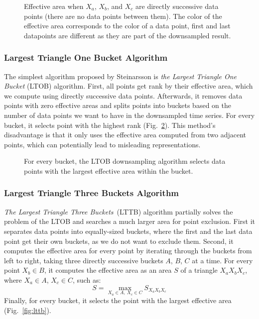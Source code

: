 \begin{figure}[htp]
    \centering
    
    \caption{Effective area when $X_a$, $X_b$, and $X_c$ are directly successive data points (there are no data points between them). The color of the effective area corresponds to the color of a data point, first and last datapoints are different as they are part of the downsampled result.}
    \label{fig:effective-area}
\end{figure}

\subsubsection{Largest Triangle One Bucket Algorithm}
The simplest algorithm proposed by Steinarsson is \textit{the Largest Triangle One Bucket} (LTOB) algorithm. First, all points get rank by their effective area, which we compute using directly successive data points. Afterwards, it removes data points with zero effective areas and splits points into buckets based on the number of data points we want to have in the downsampled time series. For every bucket, it selects point with the highest rank (Fig.~\ref{fig:ltob}). This method's disadvantage is that it only uses the effective area computed from two adjacent points, which can potentially lead to misleading representations.

\begin{figure}[htp]
    \centering
    
    \caption{For every bucket, the LTOB downsampling algorithm selects data points with the largest effective area within the bucket.}
    \label{fig:ltob}
\end{figure}

\subsubsection{Largest Triangle Three Buckets Algorithm}
\textit{The Largest Triangle Three Buckets}~(LTTB) algorithm partially solves the problem of the LTOB and searches a much larger area for point exclusion. First it separates data points into equally-sized buckets, where the first and the last data point get their own buckets, as we do not want to exclude them. Second, it computes the effective area for every point by iterating through the buckets from left to right, taking three directly successive buckets $A$, $B$, $C$ at a time. For every point $X_b \in B$, it computes the effective area as an area $S$ of a triangle $X_a X_b X_c$, where $X_a \in A$, $X_c \in C$, such as:
\begin{equation}
    S = \max_{X_a \in A,~X_c \in C} S_{X_a X_b X_c}
\end{equation}
Finally, for every bucket, it selects the point with the largest effective area (Fig.~\ref{fig:lttb}).

